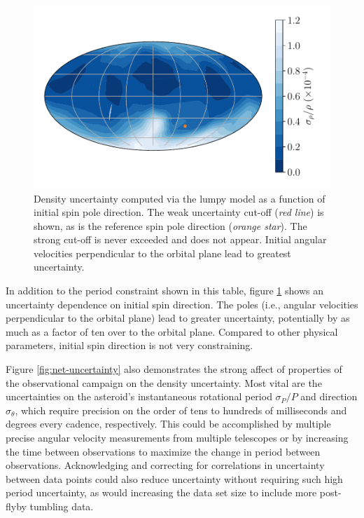 \documentclass[fleqn,usenatbib]{mnras}
\begin{document}
\begin{figure}
  \centering
  \includegraphics[width=0.9\linewidth]{figs/spin-unc.pdf}
  \caption{Density uncertainty computed via the lumpy model as a function of initial spin pole direction. The weak uncertainty cut-off (\textit{red line}) is shown, as is the reference spin pole direction (\textit{orange star}). The strong cut-off is never exceeded and does not appear. Initial angular velocities perpendicular to the orbital plane lead to greatest uncertainty.}
  \label{fig:spin-uncertainty}
\end{figure}

In addition to the period constraint shown in this table, figure \ref{fig:spin-uncertainty} shows an uncertainty dependence on initial spin direction. The poles (i.e., angular velocities perpendicular to the orbital plane) lead to greater uncertainty, potentially by as much as a factor of ten over to the orbital plane. Compared to other physical parameters, initial spin direction is not very constraining.

Figure \ref{fig:net-uncertainty} also demonstrates the strong affect of properties of the observational campaign on the density uncertainty. Most vital are the uncertainties on the asteroid's instantaneous rotational period $\sigma_P / P$ and direction $\sigma_\theta$, which require precision on the order of tens to hundreds of milliseconds and degrees every cadence, respectively. This could be accomplished by multiple precise angular velocity measurements from multiple telescopes or by increasing the time between observations to maximize the change in period between observations. Acknowledging and correcting for correlations in uncertainty between data points could also reduce uncertainty without requiring such high period uncertainty, as would increasing the data set size to include more post-flyby tumbling data.
\end{document}
